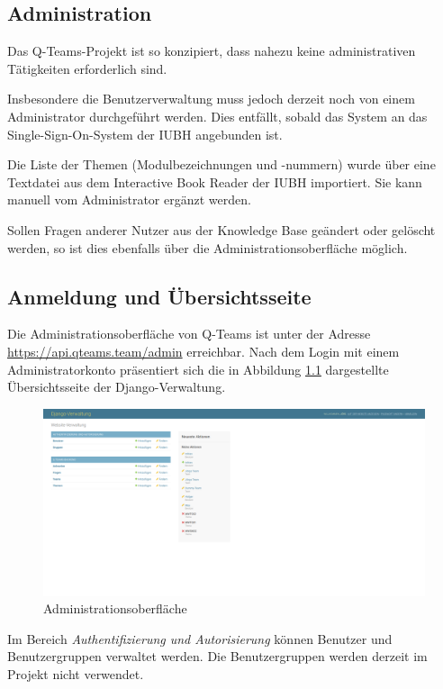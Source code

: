\documentclass[a4paper,11pt,listof=numbered,glossary=totoc,parskip=half,toc=bib]{scrreprt}
\begin{document}
\begin{appendices}
	

	\chapter{Administration}
	Das Q-Teams-Projekt ist so konzipiert, dass nahezu keine administrativen Tätigkeiten erforderlich sind.
	
	Insbesondere die Benutzerverwaltung muss jedoch derzeit noch von einem Administrator durchgeführt werden. Dies entfällt, sobald das System an das Single-Sign-On-System der IUBH angebunden ist.
	
	Die Liste der Themen (Modulbezeichnungen und -nummern) wurde über eine Textdatei aus dem Interactive Book Reader der IUBH importiert. Sie kann manuell vom Administrator ergänzt werden.

	Sollen Fragen anderer Nutzer aus der Knowledge Base geändert oder gelöscht werden, so ist dies ebenfalls über die Administrationsoberfläche möglich. 	
		
	\section{Anmeldung und Übersichtsseite}
	Die Administrationsoberfläche von Q-Teams ist unter der Adresse  \url{https://api.qteams.team/admin}	erreichbar. Nach dem Login mit einem Administratorkonto präsentiert sich die in Abbildung \ref{fig:admin} dargestellte Übersichtsseite der Django-Verwaltung.
	
	\begin{figure}[h!]
		\centering
		\includegraphics[width=\textwidth]{admin}
		\caption{Administrationsoberfläche}
		\label{fig:admin}
	\end{figure}
	
	Im Bereich \textit{Authentifizierung und Autorisierung} können Benutzer und Benutzergruppen verwaltet werden. Die Benutzergruppen werden derzeit im Projekt nicht verwendet.
	

\end{appendices}
\end{document}
